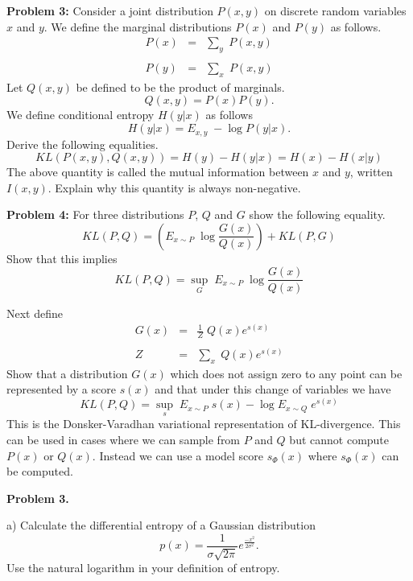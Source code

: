 \documentclass{article}
\newcommand{\solution}[1]{}
\begin{document}
\bigskip
{\bf Problem 3:} Consider a joint distribution $P(x,y)$ on discrete random variables $x$ and $y$.
We define the marginal distributions $P(x)$ and $P(y)$ as follows.
\begin{eqnarray*}
  P(x) & = & \sum_y\;P(x,y) \\
  \\
  P(y) & = & \sum_x\;P(x,y)
\end{eqnarray*}
Let $Q(x,y)$ be defined to be the product of marginals.
$$Q(x,y) = P(x)P(y).$$
We define conditional entropy $H(y|x)$ as follows
$$H(y|x) = E_{x,y} \;-\log P(y|x).$$
Derive the following equalities.
$$KL(P(x,y),Q(x,y)) = H(y) - H(y|x) = H(x) - H(x|y)$$
The above quantity is called the mutual information between $x$ and $y$, written $I(x,y)$.
Explain why this quantity is always non-negative.
    
\bigskip
{\bf Problem 4:}
For three distributions $P$, $Q$ and $G$ show the following equality.
$$KL(P,Q) =  \left(E_{x \sim P} \;\log \frac{G(x)}{Q(x)}\right) + KL(P,G)$$
Show that this implies
$$KL(P,Q) =  \sup_G \;E_{x \sim P}\; \log \frac{G(x)}{Q(x)}$$

Next define
\begin{eqnarray*}
  G(x) & = & \frac{1}{Z}\;Q(x)e^{s(x)} \\
  \\
  Z & = & \sum_x \;Q(x)e^{s(x)}
\end{eqnarray*}
Show that a distribution $G(x)$ which does not assign zero to any point can be represented by a score $s(x)$ and that under this
change of variables we have
$$KL(P,Q) =  \sup_s \;E_{x \sim P}\; s(x) - \log E_{x \sim Q} \;e^{s(x)}$$
This is the Donsker-Varadhan variational representation of KL-divergence.
This can be used in cases where we can sample from $P$ and $Q$ but cannot compute $P(x)$ or $Q(x)$.
Instead we can use a model score $s_\Phi(x)$ where $s_\Phi(x)$ can be computed.


{\bf Problem 3.}

a) Calculate the differential entropy of a Gaussian distribution
$$p(x) = \frac{1}{\sigma\sqrt{2\pi}}e^{\frac{-x^2}{2\sigma^2}}.$$
Use the natural logarithm in your definition of entropy.

\solution{
\begin{eqnarray*}
H(p) & = & E_{x \sim P} -\ln p(x) \\
\\
& = & E_{x \sim P}\; \frac{x^2}{2 \sigma^2} + \ln \sigma + \ln \sqrt{2\pi} \\
\\
& = & \frac{\sigma^2}{2\sigma^2} + \ln \sigma + \frac{1}{2}\ln 2\pi \\
\\
& = & \ln \sigma + \frac{1}{2}(1 + \ln 2\pi)
\end{eqnarray*}
}
\end{document}

